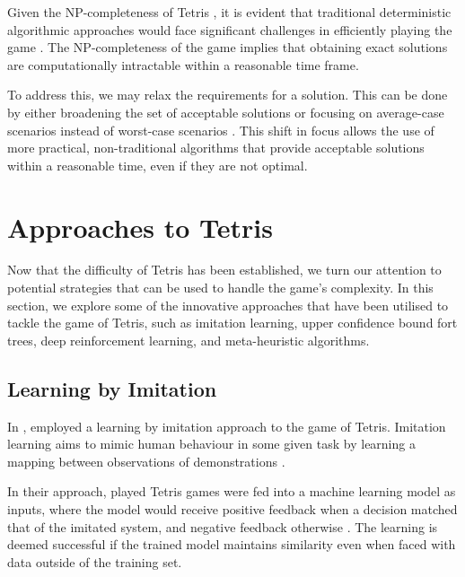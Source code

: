 \documentclass[a4paper, 12pt]{extreport}
\begin{document}
				Given the NP-completeness of Tetris \cite{tetris-is-hard-even-to-approx} \cite{tetris-o1-np-hard}, it is evident that traditional deterministic algorithmic approaches would face significant challenges in efficiently playing the game \cite{cc:conceptual-perspective}. The NP-completeness of the game implies that obtaining exact solutions are computationally intractable within a reasonable time frame.
				
				To address this, we may relax the requirements for a solution. This can be done by either broadening the set of acceptable solutions or focusing on average-case scenarios instead of worst-case scenarios \cite{cc:conceptual-perspective}. This shift in focus allows the use of more practical, non-traditional algorithms that provide acceptable solutions within a reasonable time, even if they are not optimal. 
							
		\section{Approaches to Tetris}
		
			
			Now that the difficulty of Tetris has been established, we turn our attention to potential strategies that can be used to handle the game's complexity. In this section, we explore some of the innovative approaches that have been utilised to tackle the game of Tetris, such as imitation learning, upper confidence bound fort trees, deep reinforcement learning, and meta-heuristic algorithms.
			
			\subsection{Learning by Imitation} \label{subsec:imit-learning}
			
				In \citeyear{tetris-learning-by-imitation}, \citeauthor{tetris-learning-by-imitation} \cite{tetris-learning-by-imitation} employed a learning by imitation approach to the game of Tetris. Imitation learning aims to mimic human behaviour in some given task by learning a mapping between observations of demonstrations \cite{imitation-learning}.
				
				In their approach, played Tetris games were fed into a machine learning model as inputs, where the model would receive positive feedback when a decision matched that of the imitated system, and negative feedback otherwise \cite{tetris-learning-by-imitation}. The learning is deemed successful if the trained model maintains similarity even when faced with data outside of the training set.
				
\end{document}
